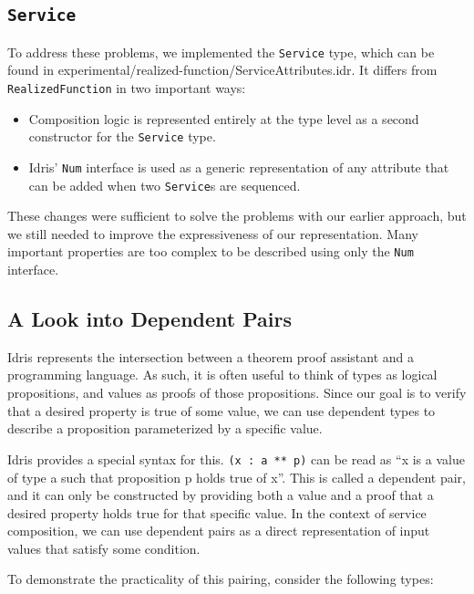 \documentclass[]{report}
\begin{document}
\subsection{\texttt{Service}}
To address these problems, we implemented the \texttt{Service} type,
which can be found in experimental/realized-function/ServiceAttributes.idr.  It
differs from \texttt{RealizedFunction} in two important ways:
\begin{itemize}
  \item Composition logic is represented entirely at the type level as a second
        constructor for the \texttt{Service} type.

  \item Idris' \texttt{Num} interface is used as a generic representation of any
        attribute that can be added when two \texttt{Service}s are sequenced.

\end{itemize}

These changes were sufficient to solve the problems with our earlier approach,
but we still needed to improve the expressiveness of our representation.  Many
important properties are too complex to be described using only the \texttt{Num}
interface.

\subsection{A Look into Dependent Pairs}
Idris represents the intersection between a theorem proof assistant and a
programming language.  As such, it is often useful to think of types as
logical propositions, and values as proofs of those propositions.  Since our
goal is to verify that a desired property is true of some value, we can use
dependent types to describe a proposition parameterized by a specific value.

Idris provides a special syntax for this.
\texttt{(x : a ** p)} can be read as ``x is a value of type a such that
proposition p holds true of x''.  This is called a dependent pair, and it can
only be constructed by providing both a value and a proof that a desired
property holds true for that specific value.  In the context of service
composition, we can use dependent pairs as a direct representation of input
values that satisfy some condition.

To demonstrate the practicality of this pairing, consider the following types:
\end{document}

